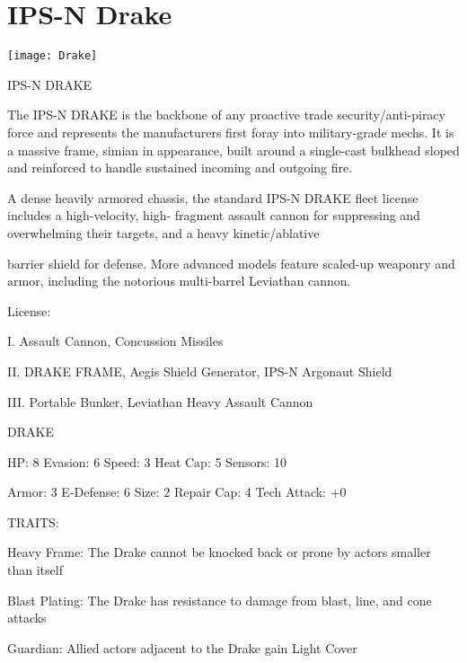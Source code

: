 \section{IPS-N Drake}

\begin{center}
    \texttt{[image: Drake]}
\end{center}


                                                    IPS-N DRAKE

The IPS-N DRAKE is the backbone of any proactive trade security/anti-piracy force and represents the
manufacturers first foray into military-grade mechs. It is a massive frame, simian in appearance, built
around a single-cast bulkhead sloped and reinforced to handle sustained incoming and outgoing fire.

A dense heavily armored chassis, the standard IPS-N DRAKE fleet license includes a high-velocity, high-
fragment assault cannon for suppressing and overwhelming their targets, and a heavy kinetic/ablative

barrier shield for defense. More advanced models feature scaled-up weaponry and armor, including the
notorious multi-barrel Leviathan cannon.




                                                     License:

I. Assault Cannon, Concussion Missiles

II. DRAKE FRAME, Aegis Shield Generator, IPS-N Argonaut Shield

III. Portable Bunker, Leviathan Heavy Assault Cannon


                                                     DRAKE

  HP: 8           Evasion: 6                             Speed: 3            Heat Cap: 5        Sensors: 10

  Armor: 3        E-Defense: 6                           Size: 2             Repair Cap: 4      Tech Attack:
                                                                                                +0

                                                     TRAITS:

  Heavy Frame: The Drake cannot be knocked back or prone by actors smaller than itself

  Blast Plating: The Drake has resistance to damage from blast, line, and cone attacks

  Guardian: Allied actors adjacent to the Drake gain Light Cover


